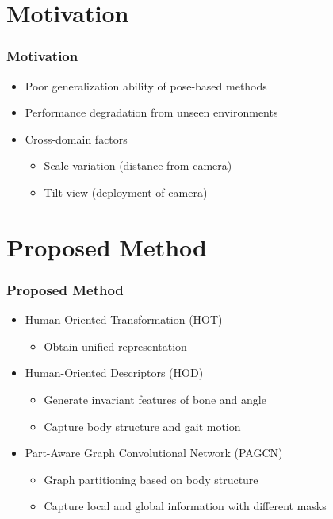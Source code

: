 \documentclass[
	12pt, %
	aspectratio=169, %
]{beamer}
\begin{document}
\section{Motivation}

\begin{frame}
	\frametitle{Motivation}

	\begin{itemize}
		\item Poor generalization ability of pose-based methods
		\item Performance degradation from unseen environments
		\item Cross-domain factors
		\begin{itemize}
			\item Scale variation (distance from camera)
			\item Tilt view (deployment of camera)
		\end{itemize}
	\end{itemize}

\end{frame}


\section{Proposed Method}

\begin{frame}
	\frametitle{Proposed Method}

	\begin{itemize}
		\item Human-Oriented Transformation (HOT)
		\begin{itemize}
			\item Obtain unified representation
		\end{itemize}
		\item Human-Oriented Descriptors (HOD)
		\begin{itemize}
			\item Generate invariant features of bone and angle
			\item Capture body structure and gait motion
		\end{itemize}
		\item Part-Aware Graph Convolutional Network (PAGCN)
		\begin{itemize}
			\item Graph partitioning based on body structure
			\item Capture local and global information with different masks
		\end{itemize}
	\end{itemize}

\end{frame}
\end{document}
